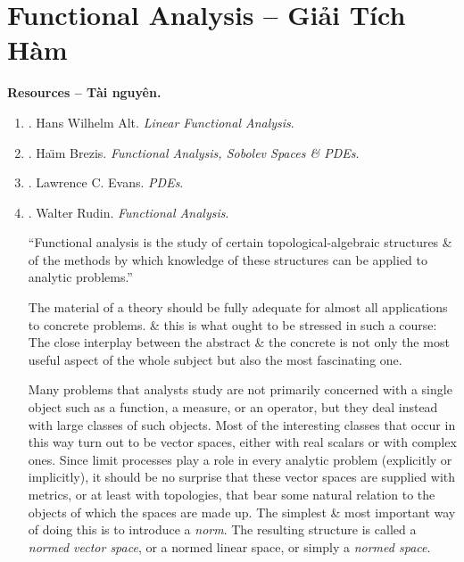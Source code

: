 \documentclass{article}
\begin{document}

\section{Functional Analysis -- Giải Tích Hàm}
\textbf{\textsf{Resources -- Tài nguyên.}}
\begin{enumerate}
	\item \cite{Alt2016}. {\sc Hans Wilhelm Alt}. {\it Linear Functional Analysis}.
	\item \cite{Brezis2011}. {\sc Ha\"\i m Brezis}. {\it Functional Analysis, Sobolev Spaces \& PDEs}.
	\item \cite{Evans2010}. {\sc Lawrence C. Evans}. {\it PDEs}.
	\item \cite{Rudin1991}. {\sc Walter Rudin}. {\it Functional Analysis}.
	
	``Functional analysis is the study of certain topological-algebraic structures \& of the methods by which knowledge of these structures can be applied to analytic problems.''
	
	The material of a theory should be fully adequate for almost all applications to concrete problems. \& this is what ought to be stressed in such a course: The close interplay between the abstract \& the concrete is not only the most useful aspect of the whole subject but also the most fascinating one.
	
	Many problems that analysts study are not primarily concerned with a single object such as a function, a measure, or an operator, but they deal instead with large classes of such objects. Most of the interesting classes that occur in this way turn out to be vector spaces, either with real scalars or with complex ones. Since limit processes play a role in every analytic problem (explicitly or implicitly), it should be no surprise that these vector spaces are supplied with metrics, or at least with topologies, that bear some natural relation to the objects of which the spaces are made up. The simplest \& most important way of doing this is to introduce a {\it norm}. The resulting structure is called a {\it normed vector space}, or a normed linear space, or simply a {\it normed space}.
	

\end{enumerate}
\end{document}
